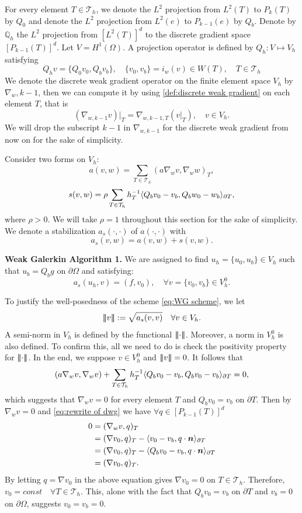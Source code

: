 	For every element $T\in\mathcal{T}_h$, we denote the $L^2$ projection
	from $L^2(T)$ to $P_k(T)$ by $Q_0$ and denote the $L^2$ projection from 
	$L^2(e)$ to $P_{k-1}(e)$ by $Q_b$. Denote by $\mathbb{Q}_h$ the $L^2$ 
	projection from $[L^2(T)]^d$ to the discrete gradient space 
	$[P_{k-1}(T)]^d$. 
	Let $V=H^1(\Omega)$. A projection operator is defined by $Q_h:V\mapsto V_h$ 
	satisfying
	\begin{equation}
		Q_h v=\{Q_0 v_0, Q_b v_b\}, \quad \{v_0,v_b\}=i_w(v)\in W(T),
		\quad T\in\mathcal{T}_h
	\end{equation}
	We denote the discrete weak gradient operator on the 
	finite element space $V_h$ by $\nabla_w,{k-1}$, then we can compute it by 
	using \eqref{def:discrete weak gradient} on each element $T$, that is
	\[ (\nabla_{w,k-1}v)|_T=\nabla_{w,k-1,T}(v|_T),\quad v\in V_h.\]
	We will drop the subscript $k-1$
	in $\nabla_{w,k-1}$ for the discrete weak gradient from now on for the sake 
	of simplicity.
	
	Consider two forms on $V_h$:
	\[a(v,w)=\sum_{T\in\mathcal{T}_h} (a\nabla_w v,\nabla_w w)_T,\]
	\[s(v,w)=\rho \sum_{T\in\mathcal{T}_h}h_T^{-1}
	\langle Q_b v_0-v_b,Q_b w_0-w_b \rangle_{\partial T},\]
	where $\rho>0$. We will take $\rho=1$
	throughout this section for the sake of simplicity. We denote a 
	stabilization $a_s(\cdot,\cdot)$ of $a(\cdot,\cdot)$ with
	\[a_s(v,w)=a(v,w)+s(v,w).\]
	
	\textbf{Weak Galerkin Algorithm 1.} We are assigned to find 
	$u_h=\{u_0,u_b\}\in V_h$ such that
	$u_b=Q_b g$ on $\partial\Omega$ and satisfying:
	\begin{equation}\label{eq:WG scheme}
		a_s(u_h,v)=(f,v_0),\quad \forall v=\{v_0,v_b\}\in V_h^0.
	\end{equation}

	To justify the well-posedness of the scheme \eqref{eq:WG scheme}, we let
	\begin{equation}
		{\left\vert\kern-0.4ex\left\vert\kern-0.4ex\left\vert v \right\vert\kern-0.4ex\right\vert\kern-0.4ex\right\vert}:=\sqrt{a_s(v,v)}\quad \forall v\in V_h .
	\end{equation}
	A semi-norm in $V_h$ is defined by the functional ${\left\vert\kern-0.4ex\left\vert\kern-0.4ex\left\vert \cdot \right\vert\kern-0.4ex\right\vert\kern-0.4ex\right\vert}$. 
	Moreover, a norm in $V_h^0$ is also defined. To confirm this, all we
	need to do is check the	positivity property for ${\left\vert\kern-0.4ex\left\vert\kern-0.4ex\left\vert \cdot \right\vert\kern-0.4ex\right\vert\kern-0.4ex\right\vert}$. In the 
	end, we suppose
	$v\in V_h^0$ and ${\left\vert\kern-0.4ex\left\vert\kern-0.4ex\left\vert v \right\vert\kern-0.4ex\right\vert\kern-0.4ex\right\vert}=0$. It follows that
	\[(a\nabla_w v,\nabla_w v)+\sum_{T\in\mathcal{T}_h} h_T^{-1}
		\langle Q_b v_0-v_b,Q_b v_0-v_b \rangle_{\partial T}=0,\]
	which suggests that $\nabla_w v=0$ for every element $T$ and $Q_b v_0=v_b$
	on $\partial T$. Then by $\nabla_w v=0$ and 
	\eqref{eq:rewrite of dwg} we have $\forall q\in [P_{k-1}(T)]^d$
	\begin{align*}
		0&=(\nabla_w v,q)_T\\
		&=(\nabla v_0,q)_T - \langle v_0-v_b,q\cdot\bm{n} \rangle_{\partial T}\\
		&=(\nabla v_0,q)_T-\langle Q_b v_0-v_b,q\cdot\bm{n} \rangle_{\partial T}\\
		&=(\nabla v_0,q)_T.	
	\end{align*}
	By letting $q=\nabla v_0$ in the above equation gives $\nabla v_0=0$ on 
	$T\in\mathcal{T}_h$. Therefore, $v_0=const\quad\forall T\in\mathcal{T}_h$.
	This, alone with the fact that $Q_b v_0=v_b$ on $\partial T$ and 
	$v_b=0$ on $\partial\Omega$, suggests $v_0=v_b=0$.
	

